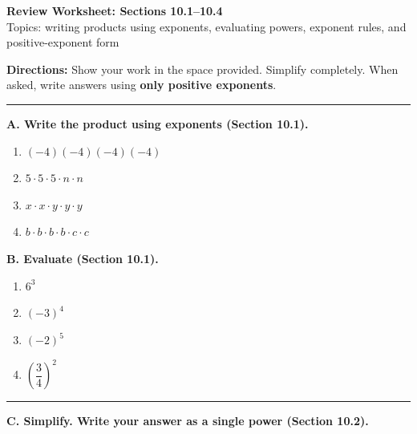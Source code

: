\documentclass[11pt]{article}
\begin{document}
\begin{center}
{\Large \textbf{Review Worksheet: Sections 10.1--10.4}}\\[4pt]
{\small Topics: writing products using exponents, evaluating powers, exponent rules, and positive-exponent form}
\end{center}

\textbf{Directions:} Show your work in the space provided. Simplify completely. When asked, write answers using \textbf{only positive exponents}.

\vspace{0.5em}
\hrule
\vspace{0.8em}

\textbf{A. Write the product using exponents (Section 10.1).}

\begin{enumerate}[label=\arabic*.]
\item $(-4)(-4)(-4)(-4)$

\item $5\cdot 5\cdot 5\cdot n\cdot n$

\item $x\cdot x\cdot y\cdot y\cdot y$

\item $b\cdot b\cdot b\cdot b\cdot c\cdot c$
\end{enumerate}

\textbf{B. Evaluate (Section 10.1).}

\begin{enumerate}[label=\arabic*., resume]
\item $6^3$

\item $(-3)^4$

\item $(-2)^5$

\item $\left(\dfrac{3}{4}\right)^2$
\end{enumerate}

\vspace{0.3em}
\hrule
\vspace{0.8em}

\textbf{C. Simplify. Write your answer as a single power (Section 10.2).}
\end{document}
